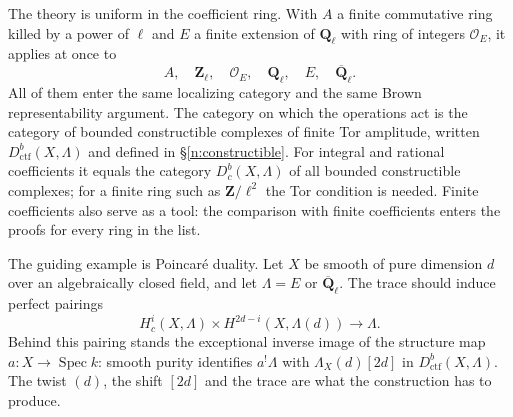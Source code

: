 \documentclass[11pt,a4paper]{article}
\numberwithin{equation}{section}
\theoremstyle{definition}
\theoremstyle{remark}
\newcommand{\Dbc}{D^b_c}
\newcommand{\Qbar}{\overline{\mathbf Q}_\ell}
\newcommand{\Ql}{\mathbf Q_\ell}
\newcommand{\Zl}{\mathbf Z_\ell}
\newcommand{\Dctf}{D^b_{\mathrm{ctf}}}
\begin{document}
The theory is uniform in the coefficient ring. With $A$ a finite
commutative ring killed by a power of $\ell$ and $E$ a finite extension
of $\Ql$ with ring of integers $\mathcal O_E$, it applies at once to
\[
 A,\quad\Zl,\quad\mathcal O_E,\quad\Ql,\quad E,\quad\Qbar.
\]
All of them enter the same localizing category and the same Brown
representability argument. The category on which the operations
act is the category of bounded constructible complexes of finite Tor
amplitude, written $\Dctf(X,\Lambda)$ and defined in
\S\ref{n:constructible}. For integral and rational coefficients it
equals the category $\Dbc(X,\Lambda)$ of all bounded constructible
complexes; for a finite ring such as $\mathbf Z/\ell^2$ the Tor
condition is needed.
Finite coefficients also serve as a tool: the comparison with finite
coefficients enters the proofs for every ring in the list.

The guiding example is Poincar\'e duality. Let $X$ be smooth of pure
dimension $d$ over an algebraically closed field, and let $\Lambda=E$ or
$\Qbar$. The trace should induce perfect pairings
\[
 H_c^i(X,\Lambda)\times H^{2d-i}(X,\Lambda(d))\longrightarrow\Lambda.
\]
Behind this pairing stands the exceptional inverse image of the
structure map $a\colon X\to\operatorname{Spec}k$: smooth purity
identifies $a^!\Lambda$ with $\Lambda_X(d)[2d]$ in $\Dctf(X,\Lambda)$. The twist $(d)$, the shift $[2d]$ and the trace
are what the construction has to produce.
\end{document}
